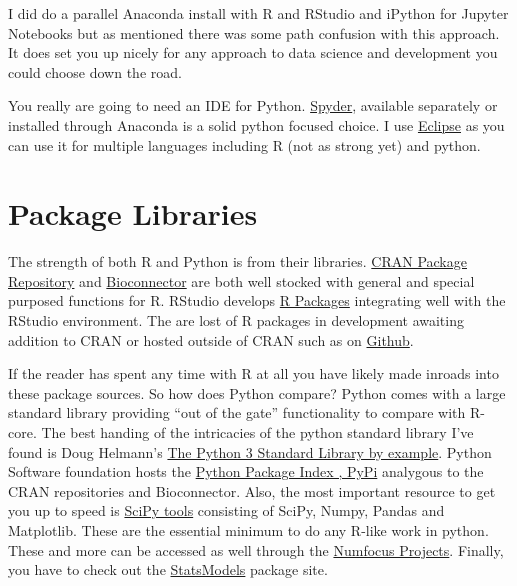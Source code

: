 \documentclass[]{book}
\theoremstyle{definition}
\theoremstyle{definition}
\theoremstyle{definition}
\theoremstyle{remark}
\begin{document}
I did do a parallel Anaconda install with R and RStudio and iPython for
Jupyter Notebooks but as mentioned there was some path confusion with
this approach. It does set you up nicely for any approach to data
science and development you could choose down the road.

You really are going to need an IDE for Python.
\href{https://www.spyder-ide.org/}{Spyder}, available separately or
installed through Anaconda is a solid python focused choice. I use
\href{https://www.eclipse.org/}{Eclipse} as you can use it for multiple
languages including R (not as strong yet) and python.

\section{Package Libraries}\label{package-libraries}

The strength of both R and Python is from their libraries.
\href{https://cran.cnr.berkeley.edu/index.html}{CRAN Package Repository}
and \href{http://www.bioconductor.org/about/}{Bioconnector} are both
well stocked with general and special purposed functions for R. RStudio
develops \href{https://www.rstudio.com/products/rpackages/}{R Packages}
integrating well with the RStudio environment. The are lost of R
packages in development awaiting addition to CRAN or hosted outside of
CRAN such as on \href{https://github.com/search?q=R+language}{Github}.

If the reader has spent any time with R at all you have likely made
inroads into these package sources. So how does Python compare? Python
comes with a large standard library providing ``out of the gate''
functionality to compare with R-core. The best handing of the
intricacies of the python standard library I've found is Doug Helmann's
\href{https://amazon.com/Python-Standard-Library-Example-Developers/dp/0134291050/}{The
Python 3 Standard Library by example}. Python Software foundation hosts
the \href{https://pypi.org/}{Python Package Index , PyPi} analygous to
the CRAN repositories and Bioconnector. Also, the most important
resource to get you up to speed is \href{https://www.scipy.org/}{SciPy
tools} consisting of SciPy, Numpy, Pandas and Matplotlib. These are the
essential minimum to do any R-like work in python. These and more can be
accessed as well through the
\href{https://numfocus.org/sponsored-projects}{Numfocus Projects}.
Finally, you have to check out the
\href{https://www.statsmodels.org/stable/index.html}{StatsModels}
package site.
\end{document}
